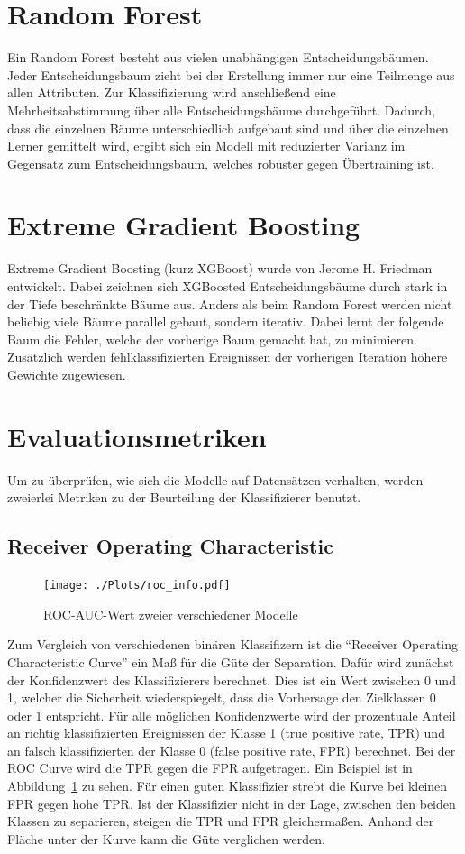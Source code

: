 \section{Random Forest}
Ein Random Forest besteht aus vielen unabhängigen Entscheidungsbäumen.
Jeder Entscheidungsbaum zieht bei der Erstellung immer nur eine Teilmenge aus allen Attributen.
Zur Klassifizierung wird anschließend eine Mehrheitsabstimmung über alle Entscheidungsbäume durchgeführt.
Dadurch, dass die einzelnen Bäume unterschiedlich aufgebaut sind und über die einzelnen Lerner gemittelt wird, ergibt sich ein Modell mit reduzierter Varianz im Gegensatz zum Entscheidungsbaum, welches robuster gegen Übertraining ist.
\section{Extreme Gradient Boosting}
Extreme Gradient Boosting (kurz XGBoost) wurde von Jerome H. Friedman~\cite{xgboost} entwickelt.
Dabei zeichnen sich  XGBoosted Entscheidungsbäume durch stark in der Tiefe beschränkte Bäume aus.
Anders als beim Random Forest werden nicht beliebig viele Bäume parallel gebaut, sondern iterativ. 
Dabei lernt der folgende Baum die Fehler, welche der vorherige Baum gemacht hat, zu minimieren.
Zusätzlich werden fehlklassifizierten Ereignissen der vorherigen Iteration höhere Gewichte zugewiesen.

\section{Evaluationsmetriken}
Um zu überprüfen, wie sich die Modelle auf Datensätzen verhalten, werden zweierlei Metriken zu der Beurteilung der Klassifizierer benutzt.
\subsection*{Receiver Operating Characteristic}
\begin{figure}
  \centering
  \texttt{[image: ./Plots/roc\_info.pdf]}
  \caption{ROC-AUC-Wert zweier verschiedener Modelle}
  \label{fig:roc}
\end{figure}
Zum Vergleich von verschiedenen binären Klassifizern ist die \enquote{Receiver Operating Characteristic Curve} ein Maß für die Güte der Separation. 
Dafür wird zunächst der Konfidenzwert des Klassifizierers berechnet. 
Dies ist ein Wert zwischen 0 und 1, welcher die Sicherheit wiederspiegelt, dass die Vorhersage den Zielklassen 0 oder 1 entspricht.
Für alle möglichen Konfidenzwerte wird der prozentuale Anteil an richtig klassifizierten Ereignissen der Klasse 1 (true positive rate, TPR) und an falsch klassifizierten der Klasse 0 (false positive rate, FPR) berechnet. 
Bei der ROC Curve wird die TPR gegen die FPR aufgetragen. 
Ein Beispiel ist in Abbildung~\ref{fig:roc} zu sehen.
Für einen guten Klassifizier strebt die Kurve bei kleinen FPR gegen hohe TPR. 
Ist der Klassifizier nicht in der Lage, zwischen den beiden Klassen zu separieren, steigen die TPR und FPR gleichermaßen. 
Anhand der Fläche unter der Kurve kann die Güte verglichen werden.
